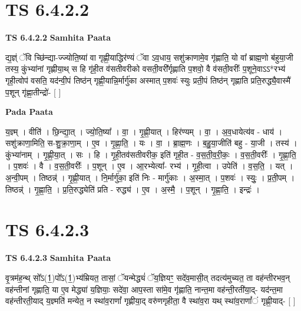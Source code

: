\documentclass[17pt]{extarticle}
\begin{document}

\section{ TS 6.4.2.2 }

\textbf{TS 6.4.2.2 } \newline
\textbf{Samhita Paata} \newline

द्य॒ज्ञ्ं ॅवि च्छि॑न्द्या-ज्ज्योति॒ष्या॑ वा गृह्णी॒याद्धिर॑ण्यं ॅवा ऽव॒धाय॒ सशु॑क्राणामे॒व गृ॑ह्णाति॒ यो वा᳚ ब्राह्म॒णो ब॑हुया॒जी तस्य॒ कुंभ्या॑नां गृह्णीया॒थ् स हि गृ॑ही॒त व॑सतीवरीको वसती॒वरी᳚र्गृह्णाति प॒शवो॒ वै व॑सती॒वरीः᳚ प॒शूने॒वाऽऽ*रभ्य॑ गृही॒त्वोप॑ वसति॒ यद॑न्वी॒पं तिष्ठ॑न् गृह्णी॒यान्नि॒र्मार्गु॑का अस्मात् प॒शवः॑ स्युः प्रती॒पं तिष्ठ॑न् गृह्णाति प्रति॒रुद्ध्यै॒वास्मै॑ प॒शून् गृ॑ह्णा॒तीन्द्रो॑- [  ] \newline

\textbf{Pada Paata} \newline

य॒ज्ञ्म् । वीति॑ । छि॒न्द्या॒त् । ज्यो॒ति॒ष्या᳚ । वा॒ । गृ॒ह्णी॒यात् । हिर॑ण्यम् । वा॒ । अ॒व॒धायेत्य॑व - धाय॑ । सशु॑क्राणा॒मिति॒ स-शु॒क्रा॒णा॒म् । ए॒व । गृ॒ह्णा॒ति॒ । यः । वा॒ । ब्रा॒ह्म॒णः । ब॒हु॒या॒जीति॑ बहु - या॒जी । तस्य॑ । कुंभ्या॑नाम् । गृ॒ह्णी॒या॒त् । सः । हि । गृ॒ही॒तव॑सतीवरीक॒ इति॑ गृही॒त - व॒स॒ती॒व॒री॒कः॒ । व॒स॒ती॒वरीः᳚ । गृ॒ह्णा॒ति॒ । प॒शवः॑ । वै । व॒स॒ती॒वरीः᳚ । प॒शून् । ए॒व । आ॒रभ्येत्या᳚- रभ्य॑ । गृ॒ही॒त्वा । उपेति॑ । व॒स॒ति॒ । यत् । अ॒न्वी॒पम् । तिष्ठन्न्॑ । गृ॒ह्णी॒यात् । नि॒र्मार्गु॑का॒ इति॑ निः - मार्गु॑काः । अ॒स्मा॒त् । प॒शवः॑ । स्युः॒ । प्र॒ती॒पम् । तिष्ठन्न्॑ । गृ॒ह्णा॒ति॒ । प्र॒ति॒रुद्ध्येति॑ प्रति - रुद्ध्य॑ । ए॒व । अ॒स्मै॒ । प॒शून् । गृ॒ह्णा॒ति॒ । इन्द्रः॑ ।  \newline





\section{ TS 6.4.2.3 }

\textbf{TS 6.4.2.3 } \newline
\textbf{Samhita Paata} \newline

वृ॒त्रम॑ह॒न्थ् सो᳚ऽ(1॒)पो᳚ऽ(1॒)भ्य॑म्रियत॒ तासां॒ ॅयन्मेद्ध्यं॑ ॅय॒ज्ञियꣳ॒॒ सदे॑व॒मासी॒त् तदत्य॑मुच्यत॒ ता वह॑न्तीरभव॒न् वह॑न्तीनां गृह्णाति॒ या ए॒व मेद्ध्या॑ य॒ज्ञियाः॒ सदे॑वा॒ आप॒स्ता सा॑मे॒व गृ॑ह्णाति॒ नान्त॒मा वह॑न्ती॒रती॑या॒द्- यद॑न्त॒मा वह॑न्तीरती॒याद् य॒ज्ञ्मति॑ मन्येत॒ न स्था॑व॒राणां᳚ गृह्णीया॒द् वरु॑णगृहीता॒ वै स्था॑व॒रा यथ् स्था॑व॒राणां᳚ं गृह्णी॒याद्- [  ] \newline
\end{document}
